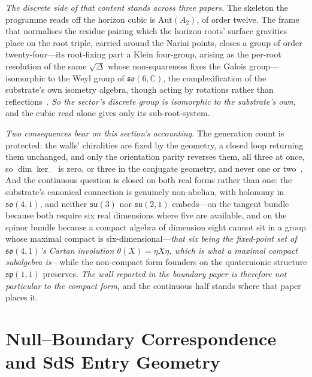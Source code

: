 \documentclass[11pt,a4paper]{article}
\theoremstyle{plain}
\theoremstyle{definition}
\theoremstyle{remark}
\newcommand{\so}{\mathfrak{so}}
\newcommand{\su}{\mathfrak{su}}
\begin{document}
\emph{The discrete side of that content stands across three papers.} The skeleton the programme reads off the horizon cubic is $\mathrm{Aut}(A_2)$, of order twelve. The frame that normalises the residue
pairing which the horizon roots' surface gravities place on the root triple, carried around the Nariai points,
closes a group of order twenty-four---its root-fixing part a Klein four-group, arising as the per-root resolution of
the same $\sqrt{\Delta}$ whose non-squareness fixes the Galois group---isomorphic to the Weyl group of
$\so(6,\mathbb{C})$, the complexification of the substrate's own isometry algebra, though acting by rotations
rather than reflections~\cite{JanzenGroupoid, JanzenAlgebroid}. \emph{So the sector's discrete group is
isomorphic to the substrate's own}, and the cubic read alone gives only its sub-root-system.

\emph{Two consequences bear on this section's accounting.} The generation count is protected: the walls' chiralities are fixed by the geometry, a closed loop returning
them unchanged, and only the orientation parity reverses them, all three at once, so $\dim\ker_-$ is zero, or
three in the conjugate geometry, and never one or two~\cite{JanzenMatter}. And the continuous question is closed on both real forms rather than one: the
substrate's canonical connection is genuinely non-abelian, with holonomy in $\so(4,1)$, and neither $\su(3)$ nor
$\mathfrak{su}(2,1)$ embeds---on the tangent bundle because both require six real dimensions where five are
available, and on the spinor bundle because a compact algebra of dimension eight cannot sit in a group whose
maximal compact is six-dimensional---\emph{that six being the fixed-point set of $\so(4,1)$'s Cartan
involution $\theta(X)=\eta X\eta$, which is what a maximal compact subalgebra
is}---while the non-compact form
founders on the quaternionic structure
$\mathfrak{sp}(1,1)$ preserves. \emph{The wall reported in the boundary paper is therefore not particular to the
compact form}, and the continuous half stands where that paper places it.

\section{Null--Boundary Correspondence and SdS Entry Geometry}
\label{sec:null-boundary-correspondence}
\end{document}
